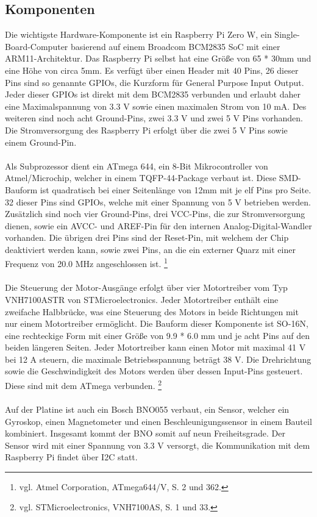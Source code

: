 \documentclass[12pt]{article}
\begin{document}
\subsection{Komponenten}
Die wichtigste Hardware-Komponente ist ein Raspberry Pi Zero W, ein Single-Board-Computer basierend auf einem Broadcom BCM2835 SoC mit einer ARM11-Architektur. Das Raspberry Pi selbst hat eine Größe von 65 * 30mm und eine Höhe von circa 5mm. Es verfügt über einen Header mit 40 Pins, 26 dieser Pins sind so genannte GPIOs, die Kurzform für General Purpose Input Output.\\
Jeder dieser GPIOs ist direkt mit dem BCM2835 verbunden und erlaubt daher eine Maximalspannung von 3.3 V sowie einen maximalen Strom von 10 mA. Des weiteren sind noch acht Ground-Pins, zwei 3.3 V und zwei 5 V Pins vorhanden. Die Stromversorgung des Raspberry Pi erfolgt über die zwei 5 V Pins sowie einem Ground-Pin.
\\\\Als Subprozessor dient ein ATmega 644, ein 8-Bit Mikrocontroller von Atmel/Microchip, welcher in einem TQFP-44-Package verbaut ist. Diese SMD-Bauform ist quadratisch bei einer Seitenlänge von 12mm mit je elf Pins pro Seite. 32 dieser Pins sind GPIOs, welche mit einer Spannung von 5 V betrieben werden. Zusätzlich sind noch vier Ground-Pins, drei VCC-Pins, die zur Stromversorgung dienen, sowie ein AVCC- und AREF-Pin für den internen Analog-Digital-Wandler vorhanden. Die übrigen drei Pins sind der Reset-Pin, mit welchem der Chip deaktiviert werden kann, sowie zwei Pins, an die ein externer Quarz mit einer Frequenz von 20.0 MHz angeschlossen ist. \footnote{\selectfont vgl. Atmel Corporation, ATmega644/V, S. 2 und 362.}
\\\\Die Steuerung der Motor-Ausgänge erfolgt über vier Motortreiber vom Typ VNH7100ASTR von STMicroelectronics. Jeder Motortreiber enthält eine zweifache Halbbrücke, was eine Steuerung des Motors in beide Richtungen mit nur einem Motortreiber ermöglicht. Die Bauform dieser Komponente ist SO-16N, eine rechteckige Form mit einer Größe von 9.9 * 6.0 mm und je acht Pins auf den beiden längeren Seiten. Jeder Motortreiber kann einen Motor mit maximal 41 V bei 12 A steuern, die maximale Betriebsspannung beträgt 38 V. Die Drehrichtung sowie die Geschwindigkeit des Motors werden über dessen Input-Pins gesteuert. Diese sind mit dem ATmega verbunden. \footnote{\selectfont vgl. STMicroelectronics, VNH7100AS, S. 1 und 33.}
\\\\Auf der Platine ist auch ein Bosch BNO055 verbaut, ein Sensor, welcher ein Gyroskop, einen Magnetometer und einen Beschleunigungssensor in einem Bauteil kombiniert. Insgesamt kommt der BNO somit auf neun Freiheitsgrade. Der Sensor wird mit einer Spannung von 3.3 V versorgt, die Kommunikation mit dem Raspberry Pi findet über I2C statt. 
\end{document}
